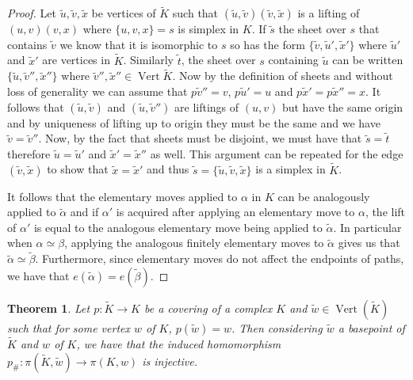 \documentclass[12pt]{article}
\newtheorem{theorem}{Theorem}
\theoremstyle{definition}
\numberwithin{equation}{theorem}
\begin{document}
\begin{proof}
  Let $\tilde{u},\tilde{v},\tilde{x}$ be vertices of $\tilde{K}$ such that $(\tilde{u},\tilde{v})(\tilde{v},\tilde{x})$ is a lifting of $(u,v)(v,x)$ where $\{u,v,x\} = s$ is  simplex in $K$. If $\tilde{s}$ the sheet over $s$ that contains $\tilde{v}$ we know that it is isomorphic to $s$ so has the form $\{\tilde{v}, \tilde{u}', \tilde{x}' \}$ where $\tilde{u}'$ and $\tilde{x}'$ are vertices in $\tilde{K}$. Similarly $\tilde{t}$, the sheet over $s$ containing $\tilde{u}$ can be written $\{\tilde{u},\tilde{v}'',\tilde{x}''\}$ where $\tilde{v}'',\tilde{x}'' \in \operatorname{Vert}{\tilde{K}}$. Now by the definition of sheets and without loss of generality we can assume that $p\tilde{v}'' = v$, $p\tilde{u}' = u$ and $p\tilde{x}' = p\tilde{x}'' = x$. It follows that $(\tilde{u},\tilde{v})$ and $(\tilde{u},\tilde{v}'')$ are liftings of $(u,v)$ but have the same origin and by uniqueness of lifting up to origin they must be the same and we have $\tilde{v} = \tilde{v}''$. Now, by the fact that sheets must be disjoint, we must have that $\tilde{s} = \tilde{t}$ therefore $\tilde{u} = \tilde{u}'$ and $\tilde{x}' = \tilde{x}''$ as well. This argument can be repeated for the edge $(\tilde{v},\tilde{x})$ to show that $\tilde{x} = \tilde{x}'$ and thus $\tilde{s} = \{\tilde{u},\tilde{v},\tilde{x}\}$ is a simplex in $\tilde{K}$.

  It follows that the elementary moves applied to $\alpha$ in $K$ can be analogously applied to $\tilde{\alpha}$ and if $\alpha'$ is acquired after applying an elementary move to $\alpha$, the lift of $\alpha'$ is equal to the analogous elementary move being applied to $\tilde{\alpha}$. In particular when $\alpha \simeq \beta$, applying the analogous finitely elementary moves to $\tilde{\alpha}$ gives us that $\tilde{\alpha} \simeq \tilde{\beta}$. Furthermore, since elementary moves do not affect the endpoints of paths, we have that $e(\tilde{\alpha}) = e(\tilde{\beta})$.
\end{proof}

\begin{theorem}
  \label{thm:injection}
  Let $p:\tilde{K} \rightarrow K$ be a covering of a complex $K$ and $\tilde{w} \in \operatorname{Vert}(\tilde{K})$ such that for some vertex $w$ of $K$, $p(\tilde{w}) = w$. Then considering $\tilde{w}$ a basepoint of $\tilde{K}$ and $w$ of $K$, we have that the induced homomorphism $p_{\#} : \pi(\tilde{K},\tilde{w}) \rightarrow \pi(K,w)$ is injective.
\end{theorem}
\end{document}
